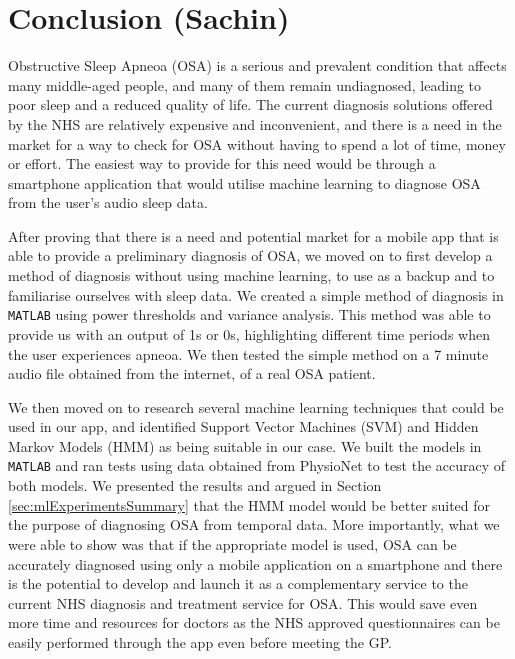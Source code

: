 \chapter{Conclusion (Sachin)}
\label{ch:conclusion}
 
Obstructive Sleep Apneoa (OSA) is a serious and prevalent condition that affects many middle-aged people, and many of them remain undiagnosed, leading to poor sleep and a reduced quality of life. The current diagnosis solutions offered by the NHS are relatively expensive and inconvenient, and there is a need in the market for a way to check for OSA without having to spend a lot of time, money or effort. The easiest way to provide for this need would be through a smartphone application that would utilise machine learning to diagnose OSA from the user's audio sleep data.

After proving that there is a need and potential market for a mobile app that is able to provide a preliminary diagnosis of OSA, we moved on to first develop a method of diagnosis without using machine learning, to use as a backup and to familiarise ourselves with sleep data. We created a simple method of diagnosis in \verb!MATLAB!\textsuperscript{\textregistered} using power thresholds and variance analysis. This method was able to provide us with an output of 1s or 0s, highlighting different time periods when the user experiences apneoa. We then tested the simple method on a 7 minute audio file obtained from the internet, of a real OSA patient.

We then moved on to research several machine learning techniques that could be used in our app, and identified Support Vector Machines (SVM) and Hidden Markov Models (HMM) as being suitable in our case. We built the models in \verb!MATLAB!\textsuperscript{\textregistered} and ran tests using data obtained from PhysioNet to test the accuracy of both models. We presented the results and argued in Section \ref{sec:mlExperimentsSummary} that the HMM model would be better suited for the purpose of diagnosing OSA from temporal data. 
More importantly, what we were able to show was that if the appropriate model is used, OSA can be accurately diagnosed using only a mobile application on a smartphone and there is the potential to develop and launch it as a complementary service to the current NHS diagnosis and treatment service for OSA. This would save even more time and resources for doctors as the NHS approved questionnaires can be easily performed through the app even before meeting the GP.


